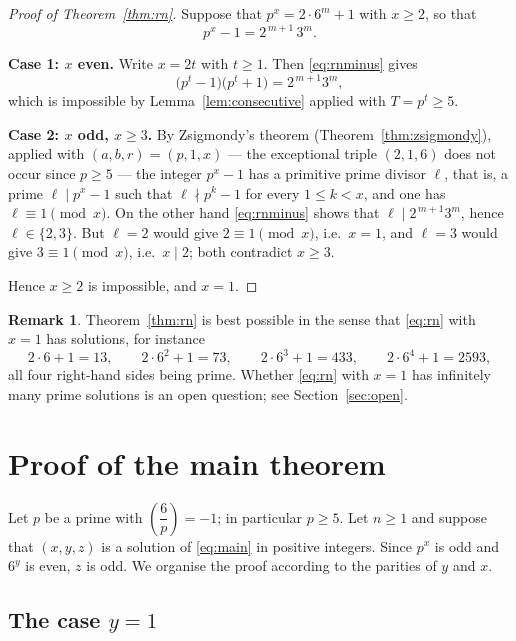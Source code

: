 \documentclass[preprint,12pt]{elsarticle}
\theoremstyle{definition}
\newtheorem{remark}[theorem]{Remark}
\newcommand{\leg}[2]{\left(\dfrac{#1}{#2}\right)}
\begin{document}
\begin{proof}[Proof of Theorem~\ref{thm:rn}]
Suppose that $p^{x}=2\cdot 6^{m}+1$ with $x\geq 2$, so that
\begin{equation}\label{eq:rnminus}
p^{x}-1=2^{\,m+1}\,3^{m}.
\end{equation}

\medskip
\noindent\textbf{Case 1: $x$ even.} Write $x=2t$ with $t\geq 1$. Then
\eqref{eq:rnminus} gives
\[
\bigl(p^{t}-1\bigr)\bigl(p^{t}+1\bigr)=2^{\,m+1}3^{m},
\]
which is impossible by Lemma~\ref{lem:consecutive} applied with $T=p^{t}\geq
5$.

\medskip
\noindent\textbf{Case 2: $x$ odd, $x\geq 3$.} By Zsigmondy's theorem
(Theorem~\ref{thm:zsigmondy}), applied with $(a,b,r)=(p,1,x)$ --- the
exceptional triple $(2,1,6)$ does not occur since $p\geq 5$ --- the integer
$p^{x}-1$ has a primitive prime divisor $\ell$, that is, a prime
$\ell\mid p^{x}-1$ such that $\ell\nmid p^{k}-1$ for every $1\leq k<x$, and
one has $\ell\equiv 1\pmod x$. On the other hand \eqref{eq:rnminus} shows
that $\ell\mid 2^{\,m+1}3^{m}$, hence $\ell\in\{2,3\}$. But $\ell=2$ would
give $2\equiv 1\pmod x$, i.e.\ $x=1$, and $\ell=3$ would give $3\equiv
1\pmod x$, i.e.\ $x\mid 2$; both contradict $x\geq 3$.

\medskip
Hence $x\geq 2$ is impossible, and $x=1$. \qedhere
\end{proof}

\begin{remark}\label{rem:rn}
Theorem~\ref{thm:rn} is best possible in the sense that \eqref{eq:rn} with
$x=1$ has solutions, for instance
\[
2\cdot 6+1=13,\qquad 2\cdot 6^{2}+1=73,\qquad 2\cdot 6^{3}+1=433,\qquad
2\cdot 6^{4}+1=2593,
\]
all four right-hand sides being prime. Whether \eqref{eq:rn} with $x=1$ has
infinitely many prime solutions is an open question; see
Section~\ref{sec:open}.
\end{remark}

\section{Proof of the main theorem}\label{sec:proof}

Let $p$ be a prime with $\leg{6}{p}=-1$; in particular $p\geq 5$. Let
$n\geq 1$ and suppose that $(x,y,z)$ is a solution of \eqref{eq:main} in
positive integers. Since $p^{x}$ is odd and $6^{y}$ is even, $z$ is odd. We
organise the proof according to the parities of $y$ and $x$.

\subsection{The case $y=1$}
\end{document}
